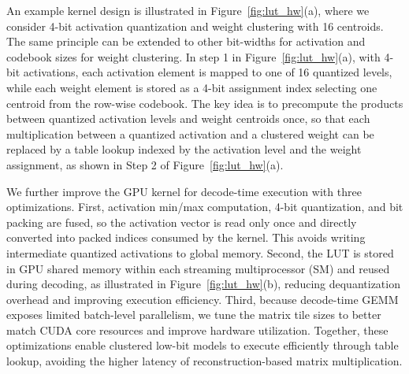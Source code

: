 \documentclass{article}
\begin{document}
An example kernel design is illustrated in Figure~\ref{fig:lut_hw}(a), where we consider 4-bit activation quantization and weight clustering with 16 centroids. The same principle can be extended to other bit-widths for activation and codebook sizes for weight clustering. In step 1 in Figure~\ref{fig:lut_hw}(a), with 4-bit activations, each activation element is mapped to one of 16 quantized levels, while each weight element is stored as a 4-bit assignment index selecting one centroid from the row-wise codebook. The key idea is to precompute the products between quantized activation levels and weight centroids once, so that each multiplication between a quantized activation and a clustered weight can be replaced by a table lookup indexed by the activation level and the weight assignment, as shown in Step 2 of Figure~\ref{fig:lut_hw}(a).

We further improve the GPU kernel for decode-time execution with three optimizations. First, activation min/max computation, 4-bit quantization, and bit packing are fused, so the activation vector is read only once and directly converted into packed indices consumed by the kernel. This avoids writing intermediate quantized activations to global memory. Second, the LUT is stored in GPU shared memory within each streaming multiprocessor (SM) and reused during decoding, as illustrated in Figure~\ref{fig:lut_hw}(b), reducing dequantization overhead and improving execution efficiency. Third, because decode-time GEMM exposes limited batch-level parallelism, we tune the matrix tile sizes to better match CUDA core resources and improve hardware utilization. Together, these optimizations enable clustered low-bit models to execute efficiently through table lookup, avoiding the higher latency of reconstruction-based matrix multiplication.
\end{document}
